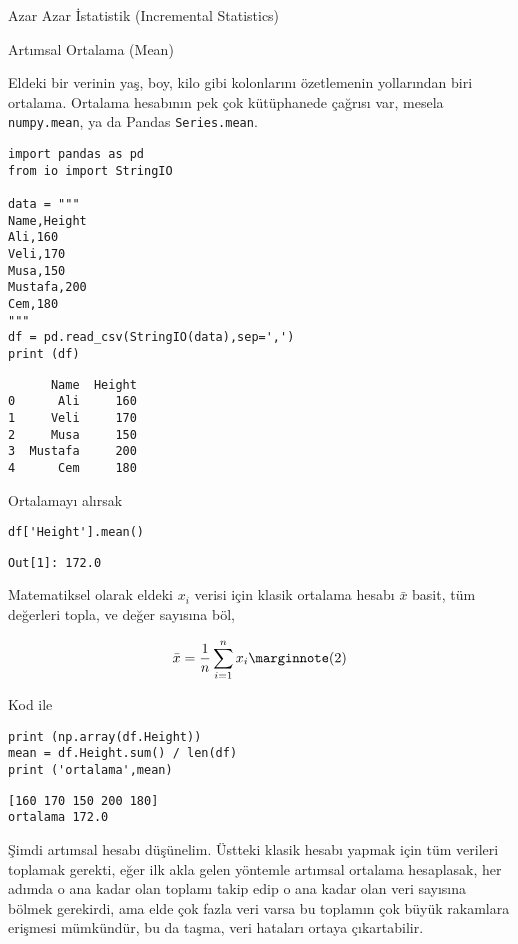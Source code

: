 \documentclass[12pt,fleqn]{article}\usepackage{../../common}
\begin{document}
Azar Azar İstatistik (Incremental Statistics)

Artımsal Ortalama (Mean)

Eldeki bir verinin yaş, boy, kilo gibi kolonlarını özetlemenin yollarından biri
ortalama. Ortalama hesabının pek çok kütüphanede çağrısı var, mesela
\verb!numpy.mean!, ya da Pandas \verb!Series.mean!.


\begin{verbatim}
import pandas as pd
from io import StringIO

data = """
Name,Height
Ali,160
Veli,170
Musa,150
Mustafa,200
Cem,180
"""
df = pd.read_csv(StringIO(data),sep=',')
print (df)
\end{verbatim}

\begin{verbatim}
      Name  Height
0      Ali     160
1     Veli     170
2     Musa     150
3  Mustafa     200
4      Cem     180
\end{verbatim}

Ortalamayı alırsak

\begin{verbatim}
df['Height'].mean()
\end{verbatim}

\begin{verbatim}
Out[1]: 172.0
\end{verbatim}

Matematiksel olarak eldeki $x_i$ verisi için klasik ortalama hesabı $\bar{x}$
basit, tüm değerleri topla, ve değer sayısına böl,

$$
\bar{x} = \frac{1}{n} \sum_{i=1}^{n} x_i
\mlabel{2}
$$

Kod ile

\begin{verbatim}
print (np.array(df.Height))
mean = df.Height.sum() / len(df)
print ('ortalama',mean)
\end{verbatim}

\begin{verbatim}
[160 170 150 200 180]
ortalama 172.0
\end{verbatim}

Şimdi artımsal hesabı düşünelim. Üstteki klasik hesabı yapmak için tüm verileri
toplamak gerekti, eğer ilk akla gelen yöntemle artımsal ortalama hesaplasak, her
adımda o ana kadar olan toplamı takip edip o ana kadar olan veri sayısına bölmek
gerekirdi, ama elde çok fazla veri varsa bu toplamın çok büyük rakamlara
erişmesi mümkündür, bu da taşma, veri hataları ortaya çıkartabilir.
\end{document}
